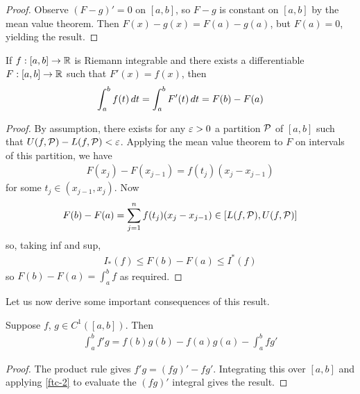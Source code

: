 \documentclass{../template/note}
\begin{document}
    \begin{proof}
        Observe \((F-g)' = 0\) on \([a, b]\), so \(F-g\) is constant on \([a, b]\) by the mean value theorem. Then \(F(x) - g(x) = F(a) - g(a)\), but \(F(a) = 0\), yielding the result.
    \end{proof}
    
    \begin{theorem}
        \label{ftc-2}
        If \(f: [a, b] \to \mathbb R\) is Riemann integrable and there exists a differentiable \(F: [a, b] \to \mathbb R\) such that \(F'(x) = f(x)\), then
        \begin{align*}
            \int_a^b f(t) \,d{t} = \int_a^b F'(t) \,d{t} = F(b) - F(a)
        \end{align*}
    \end{theorem}
    
    \begin{proof}
        By assumption, there exists for any \(\varepsilon > 0\) a partition \(\mathcal{P}\) of \([a, b]\) such that \(U(f, \mathcal{P}) - L(f, \mathcal{P}) < \varepsilon\). Applying the mean value theorem to \(F\) on intervals of this partition, we have
        \begin{align*}
            F(x_j) - F(x_{j-1}) = f(t_j)(x_j-x_{j-1})
        \end{align*}
        for some \(t_j \in (x_{j-1}, x_j)\). Now
        \begin{align*}
            F(b) - F(a) = \sum_{j=1}^n f(t_j)(x_j-x_{j-1}) \in [L(f, \mathcal{P}), U(f, \mathcal{P})]
        \end{align*}
        so, taking inf and sup,
        \begin{align*}
            I_*(f) \leq F(b)-F(a) \leq I^*(f)
        \end{align*}
        so \(F(b)-F(a) = \int_a^b f\) as required.
    \end{proof}

    
    Let us now derive some important consequences of this result.

    \begin{proposition}
        Suppose \(f\), \(g \in C^1([a, b])\). Then
        \begin{align*}
            \int_a^b f'g = f(b)g(b) - f(a)g(a) - \int_a^b fg'
        \end{align*}
    \end{proposition}
    
    \begin{proof}
        The product rule gives \(f'g = (fg)' - fg'\). Integrating this over \([a, b]\) and applying \cref{ftc-2} to evaluate the \((fg)'\) integral gives the result.
    \end{proof}
    
\end{document}
